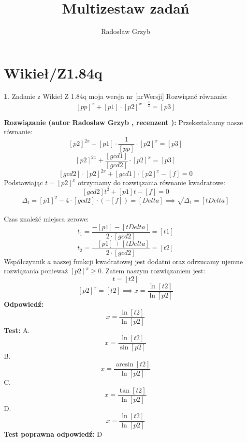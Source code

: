 \documentclass[12pt, a4paper]{article}
\title{Multizestaw zadań}
\author{Radosław Grzyb}
\date{}
\theoremstyle{definition} %
\newtheorem{zad}{}
\newcommand{\kategoria}[1]{\section{#1}} %
\newcommand{\zadStart}[1]{\begin{zad}#1\newline} %
\newcommand{\zadStop}{\end{zad}}   %
\newcommand{\rozwStart}[2]{\noindent \textbf{Rozwiązanie (autor #1 , recenzent #2): }\newline} %
\newcommand{\rozwStop}{\newline}                                            %
\newcommand{\odpStart}{\noindent \textbf{Odpowiedź:}\newline}    %
\newcommand{\odpStop}{\newline}                                             %
\newcommand{\testStart}{\noindent \textbf{Test:}\newline} %
\newcommand{\testStop}{\newline} %
\newcommand{\kluczStart}{\noindent \textbf{Test poprawna odpowiedź:}\newline} %
\newcommand{\kluczStop}{\newline} %
\begin{document}
\maketitle
\kategoria{Wikieł/Z1.84q}
\zadStart{Zadanie z Wikieł Z 1.84q moja wersja nr [nrWersji]}
Rozwiązać równanie:
$$[pp]^x+[p1]\cdot[p2]^{x-\frac{1}{2}}=[p3]$$
\zadStop
\rozwStart{Radosław Grzyb}{}
Przekształcamy nasze równanie:
$$[p2]^{2x}+[p1]\cdot\frac{1}{[pp]}\cdot[p2]^{x}=[p3]$$
$$[p2]^{2x}+\frac{[gcd1]}{[gcd2]}\cdot[p2]^{x}=[p3]$$
$$[gcd2]\cdot[p2]^{2x}+[gcd1]\cdot[p2]^{x}-[f]=0$$
Podstawiając $t=[p2]^{x}$ otrzymamy do rozwiązania równanie kwadratowe:
$$[gcd2]t^{2}+[p1]t-[f]=0$$
$$\Delta_{t}=[p1]^2-4\cdot[gcd2]\cdot(-[f])=[Delta]\implies \sqrt{\Delta_{t}}=[tDelta]$$\\
Czas znaleźć miejsca zerowe:
$$t_{1}=\frac{-[p1]-[tDelta]}{2\cdot[gcd2]}=[t1]$$
$$t_{2}=\frac{-[p1]+[tDelta]}{2\cdot[gcd2]}=[t2]$$
Współczynnik $a$ naszej funkcji kwadratowej jest dodatni oraz odrzucamy ujemne rozwiązania ponieważ $[p2]^x\geq0$. Zatem naszym rozwiązaniem jest:
$$t=[t2]$$
$$[p2]^x=[t2] \implies x=\frac{\ln[t2]}{\ln[p2]}$$
\rozwStop
\odpStart
$$x=\frac{\ln[t2]}{\ln[p2]}$$
\odpStop
\testStart
A.$$x=\frac{\ln[t2]}{\sin[p2]}$$
B.$$x=\frac{\arcsin[t2]}{\ln[p2]}$$
C.$$x=\frac{\tan[t2]}{\ln[p2]}$$
D.$$x=\frac{\ln[t2]}{\ln[p2]}$$
\testStop
\kluczStart
D
\kluczStop
\end{document}
